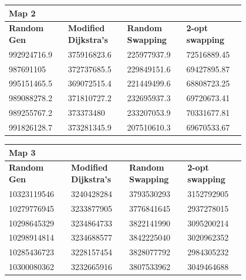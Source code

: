 \documentclass{article}
\begin{document}
\begin{table}[H]
    \centering
    \begin{tabular}{|p{0.2\linewidth}|p{0.2\linewidth}|p{0.2\linewidth}|p{0.2\linewidth}|}
    \hline
        \textbf{Map 2} & ~ & ~ & ~ \\ \hline
        \textbf{Random Gen} & \textbf{Modified Dijkstra's} & \textbf{Random Swapping} & \textbf{2-opt swapping} \\ \hline
        992924716.9 & 375916823.6 & 225977937.9 & 72516889.45 \\ \hline
        987691105 & 372737685.5 & 229849151.6 & 69427895.87 \\ \hline
        995151465.5 & 369072515.4 & 221449499.6 & 68808723.25 \\ \hline
        989088278.2 & 371810727.2 & 232695937.3 & 69720673.41 \\ \hline
        989255767.2 & 373373480 & 233207053.9 & 70331677.81 \\ \hline
        991826128.7 & 373281345.9 & 207510610.3 & 69670533.67 \\ \hline
    \end{tabular}
\end{table}

\begin{table}[H]
    \centering
    \begin{tabular}{|p{0.2\linewidth}|p{0.2\linewidth}|p{0.2\linewidth}|p{0.2\linewidth}|}
    \hline
        \textbf{Map 3} & ~ & ~ & ~ \\ \hline
        \textbf{Random Gen} & \textbf{Modified Dijkstra's} & \textbf{Random Swapping} & \textbf{2-opt swapping} \\ \hline
        10323119546 & 3240428284 & 3793530293 & 3152792905 \\ \hline
        10279776945 & 3233877905 & 3776841645 & 2937278015 \\ \hline
        10298645329 & 3234864733 & 3822141990 & 3095200214 \\ \hline
        10298914814 & 3234688577 & 3842225040 & 3020962352 \\ \hline
        10285436723 & 3228157454 & 3828077792 & 2984305232 \\ \hline
        10300080362 & 3232665916 & 3807533962 & 3049464688 \\ \hline
    \end{tabular}
\end{table}
\end{document}
